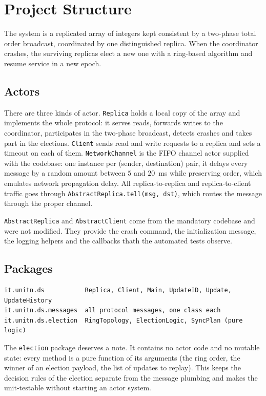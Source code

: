 \section{Project Structure}

The system is a replicated array of integers kept consistent by a two-phase total order broadcast, coordinated by one distinguished replica. When the coordinator crashes, the surviving replicas elect a new one with a ring-based algorithm and resume service in a new epoch.

\subsection*{Actors}

There are three kinds of actor. \texttt{Replica} holds a local copy of the array and implements the whole protocol: it serves reads, forwards writes to the coordinator, participates in the two-phase broadcast, detects crashes and takes part in the elections. \texttt{Client} sends read and write requests to a replica and sets a timeout on each of them. \texttt{NetworkChannel} is the FIFO channel actor supplied with the codebase: one instance per (sender, destination) pair, it delays every message by a random amount between $5$ and $20$~ms while preserving order, which emulates network propagation delay. All replica-to-replica and replica-to-client traffic goes through \texttt{AbstractReplica.tell(msg, dst)}, which routes the message through the proper channel.

\texttt{AbstractReplica} and \texttt{AbstractClient} come from the mandatory codebase and were not modified. They provide the crash command, the initialization message, the logging helpers and the callbacks thath the automated tests observe.

\subsection*{Packages}

\begin{verbatim}
it.unitn.ds           Replica, Client, Main, UpdateID, Update, UpdateHistory
it.unitn.ds.messages  all protocol messages, one class each
it.unitn.ds.election  RingTopology, ElectionLogic, SyncPlan (pure logic)
\end{verbatim}

The \texttt{election} package deserves a note. It contains no actor code and no mutable state: every method is a pure function of its arguments (the ring order, the winner of an election payload, the list of updates to replay). This keeps the decision rules of the election separate from the message plumbing and makes the unit-testable without starting an actor system.

